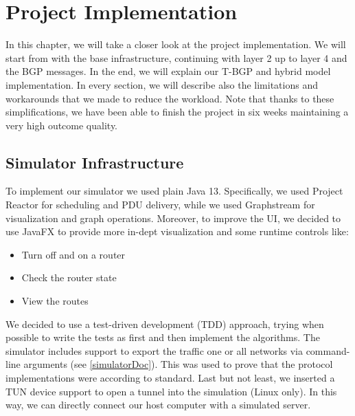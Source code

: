 \chapter{Project Implementation}
In this chapter, we will take a closer look at the project implementation.
We will start from with the base infrastructure, continuing with layer 2 up to layer 4 and the BGP messages.
In the end, we will explain our T-BGP and hybrid model implementation.\newline
In every section, we will describe also the limitations and workarounds that we made to reduce the workload.
Note that thanks to these simplifications, we have been able to finish the project in six weeks maintaining a very high outcome quality.

\section{Simulator Infrastructure}
To implement our simulator we used plain Java 13.
Specifically, we used Project Reactor for scheduling and PDU delivery, while we used Graphstream for visualization and graph operations.
Moreover, to improve the UI, we decided to use JavaFX to provide more in-dept visualization and some runtime controls like:
\begin{itemize}
 \item Turn off and on a router
 \item Check the router state
 \item View the routes
\end{itemize}
We decided to use a test-driven development (TDD) approach, trying when possible to write the tests as first and then implement the algorithms. \newline
The simulator includes support to export the traffic one or all networks via command-line arguments (see \ref{simulatorDoc}). This was used to prove that the protocol implementations were according to standard.\newline
Last but not least, we inserted a TUN device support to open a tunnel into the simulation (Linux only).
In this way, we can directly connect our host computer with a simulated server.

